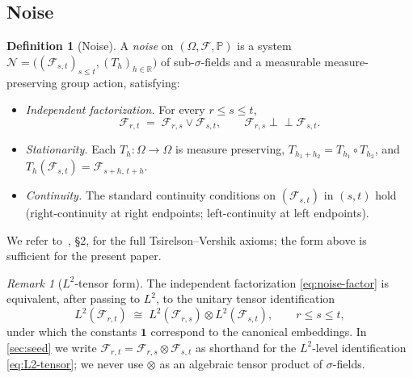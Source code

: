 \documentclass[11pt,reqno]{amsart}
\theoremstyle{plain}
\theoremstyle{definition}
\newtheorem{definition}[theorem]{Definition}
\theoremstyle{remark}
\newtheorem{remark}[theorem]{Remark}
\newcommand{\R}{\mathbb{R}}
\newcommand{\Prob}{\mathbb{P}}
\begin{document}
\subsection{Noise}\label{sec:def-noise}

\begin{definition}[Noise]\label{def:noise}
A \emph{noise} on $(\Omega,\mathcal F,\Prob)$ is a system
$\mathcal N=\bigl((\mathcal F_{s,t})_{s\le t},(T_h)_{h\in\R}\bigr)$
of sub-$\sigma$-fields and a measurable measure-preserving group
action, satisfying:
\begin{itemize}
\item[$(\mathrm i)$] \emph{Independent factorization.} For every
$r\le s\le t$,
\begin{equation}\label{eq:noise-factor}
  \mathcal F_{r,t}\;=\;\mathcal F_{r,s}\vee\mathcal F_{s,t},
  \qquad \mathcal F_{r,s}\perp\!\!\!\perp\mathcal F_{s,t}.
\end{equation}
\item[$(\mathrm{ii})$] \emph{Stationarity.} Each
$T_h\colon\Omega\to\Omega$ is measure preserving,
$T_{h_1+h_2}=T_{h_1}\circ T_{h_2}$, and
$T_h(\mathcal F_{s,t})=\mathcal F_{s+h,\,t+h}$.
\item[$(\mathrm{iii})$] \emph{Continuity.} The standard continuity
conditions on $(\mathcal F_{s,t})$ in $(s,t)$ hold (right-continuity
at right endpoints; left-continuity at left endpoints).
\end{itemize}
We refer to~\cite{Tsirelson2004}, \S 2, for the full
Tsirelson--Vershik axioms; the form above is sufficient for the
present paper.
\end{definition}

\begin{remark}[\texorpdfstring{$L^2$-tensor form}{L^2-tensor form}]\label{rem:noise-l2-tensor}
The independent factorization \eqref{eq:noise-factor} is equivalent,
after passing to $L^2$, to the unitary tensor identification
\begin{equation}\label{eq:L2-tensor}
  L^2(\mathcal F_{r,t})\;\cong\;L^2(\mathcal F_{r,s})\otimes L^2(\mathcal F_{s,t}),
  \qquad r\le s\le t,
\end{equation}
under which the constants $\mathbf 1$ correspond to the canonical
embeddings. In \cref{sec:seed} we write
$\mathcal F_{r,t}=\mathcal F_{r,s}\otimes\mathcal F_{s,t}$ as shorthand
for the $L^2$-level identification \eqref{eq:L2-tensor}; we never use
$\otimes$ as an algebraic tensor product of $\sigma$-fields.
\end{remark}
\end{document}
